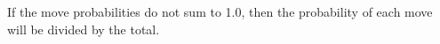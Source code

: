 If the move probabilities do not sum to 1.0, 
then the probability of each move will be divided by the total.
%
%
%
%
%
%
